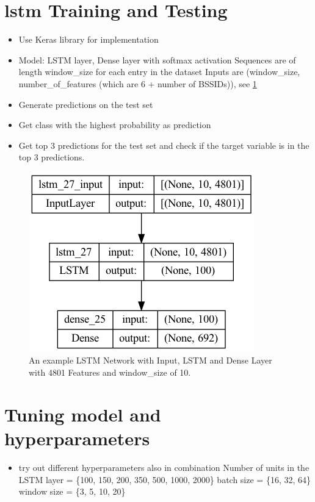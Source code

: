 \section{\ac{lstm} Training and Testing}
\begin{itemize}
    \item Use Keras library for implementation \cite{keras}
    \item Model: LSTM layer, Dense layer with softmax activation
    \subitem Sequences are of length window\_size for each entry in the dataset
    \subitem Inputs are (window\_size, number\_of\_features (which are 6 + number of BSSIDs)), see \cref{fig:lstm_architecture}
    \item Generate predictions on the test set
    \item Get class with the highest probability as prediction
    \item Get top 3 predictions for the test set and check if the target variable is in the top 3 predictions.
\end{itemize}

\begin{figure}[h!]
    \centering
    \includegraphics[scale=0.5]{images/model_plot.png}
    \caption{An example LSTM Network with Input, LSTM and Dense Layer with 4801 Features and window\_size of 10.}
    \label{fig:lstm_architecture}
\end{figure}


\section{Tuning model and hyperparameters}
\begin{itemize}
    \item try out different hyperparameters also in combination
    \subitem Number of units in the LSTM layer = \{100, 150, 200, 350, 500, 1000, 2000\}
    \subitem batch size = \{16, 32, 64\}
    \subitem window size = \{3, 5, 10, 20\}
\end{itemize}



